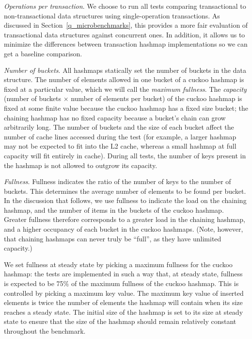 \emph{Operations per transaction}. We choose to run all tests comparing transactional to non-transactional data structures using single-operation transactions. As discussed in Section~\ref{q_microbenchmarks}, this provides a more fair evaluation of transactional data structures against concurrent ones. In addition, it allows us to minimize the differences between transaction hashmap implementations so we can get a baseline comparison.

\emph{Number of buckets}. All hashmaps statically set the number of buckets in the data structure. The number of elements allowed in one bucket of a cuckoo hashmap is fixed at a particular value, which we will call the \emph{maximum fullness}. 
        The \emph{capacity} (number of buckets $\times$ number of elements per bucket) of the cuckoo hashmap is fixed at some finite value because the cuckoo hashmap has a fixed size bucket; the chaining hashmap has no fixed capacity because a bucket's chain can grow arbitrarily long.
        The number of buckets and the size of each bucket affect the number of cache lines accessed during the test (for example, a larger hashmap may not be expected to fit into the L2 cache, whereas a small hashmap at full capacity will fit entirely in cache). During all tests, the number of keys present in the hashmap is not allowed to outgrow its capacity.
    
    \emph{Fullness}. Fullness indicates the ratio of the number of keys to the number of buckets. This determines the average number of elements to be found per bucket. 
    In the discussion that follows, we use fullness to indicate the load on the chaining hashmap, and the number of items in the buckets of the cuckoo hashmap. Greater fullness therefore corresponds to a greater load in the chaining hashmap, and a higher occupancy of each bucket in the cuckoo hashmaps. (Note, however, that chaining hashmaps can never truly be ``full'', as they have unlimited capacity.)
    
    We set fullness at steady state by picking a maximum fullness for the cuckoo hashmap: the tests are implemented in such a way that, at steady state, fullness is expected to be 75\% of the maximum fullness of the cuckoo hashmap. This is controlled by picking a maximum key value. The maximum key value of inserted elements is twice the number of elements the hashmap will contain when its size reaches a steady state. The initial size of the hashmap is set to its size at steady state to ensure that the size of the hashmap should remain relatively constant throughout the benchmark. 
    

